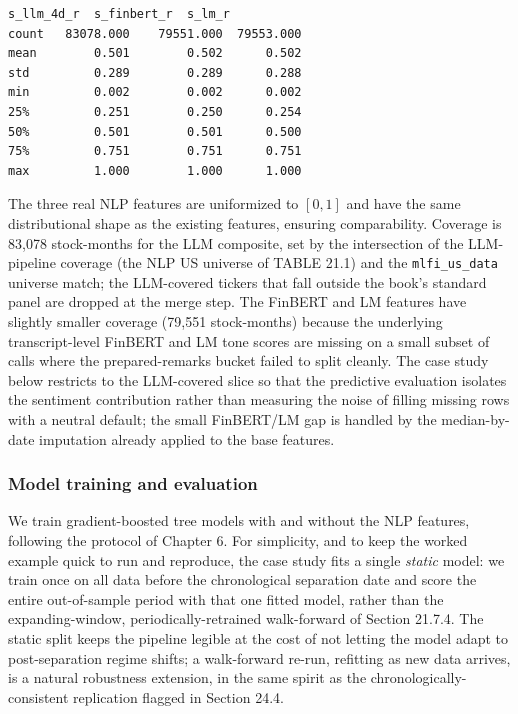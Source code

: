 \begin{verbatim}
s_llm_4d_r  s_finbert_r  s_lm_r
count   83078.000    79551.000  79553.000
mean        0.501        0.502      0.502
std         0.289        0.289      0.288
min         0.002        0.002      0.002
25%         0.251        0.250      0.254
50%         0.501        0.501      0.500
75%         0.751        0.751      0.751
max         1.000        1.000      1.000
\end{verbatim}

The three real NLP features are uniformized to $[0, 1]$ and have the same distributional shape as the existing features, ensuring comparability. Coverage is 83,078 stock-months for the LLM composite, set by the intersection of the LLM-pipeline coverage (the NLP US universe of TABLE 21.1) and the \texttt{mlfi\_us\_data} universe match; the LLM-covered tickers that fall outside the book's standard panel are dropped at the merge step. The FinBERT and LM features have slightly smaller coverage (79,551 stock-months) because the underlying transcript-level FinBERT and LM tone scores are missing on a small subset of calls where the prepared-remarks bucket failed to split cleanly. The case study below restricts to the LLM-covered slice so that the predictive evaluation isolates the sentiment contribution rather than measuring the noise of filling missing rows with a neutral default; the small FinBERT/LM gap is handled by the median-by-date imputation already applied to the base features.

\subsubsection{Model training and evaluation}

We train gradient-boosted tree models with and without the NLP features, following the protocol of Chapter 6. For simplicity, and to keep the worked example quick to run and reproduce, the case study fits a single \textit{static} model: we train once on all data before the chronological separation date and score the entire out-of-sample period with that one fitted model, rather than the expanding-window, periodically-retrained walk-forward of Section 21.7.4. The static split keeps the pipeline legible at the cost of not letting the model adapt to post-separation regime shifts; a walk-forward re-run, refitting as new data arrives, is a natural robustness extension, in the same spirit as the chronologically-consistent replication flagged in Section 24.4.

